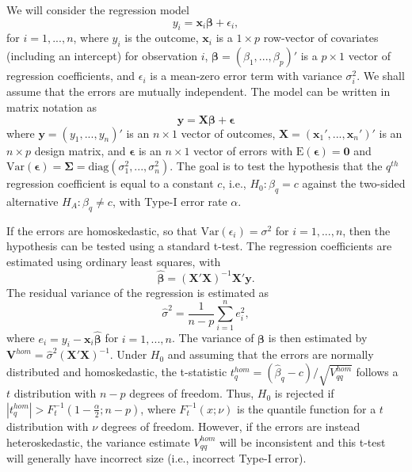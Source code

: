 \documentclass{article}\usepackage[]{graphicx}\usepackage[]{color}
\newcommand{\E}{\text{E}}
\newcommand{\Var}{\text{Var}}
\newcommand{\diag}{\text{diag}}
\newcommand{\bm}{\mathbf}
\newcommand{\bs}{\boldsymbol}
\begin{document}
We will consider the regression model
\begin{equation}
y_i = \bm{x}_i\bs\beta + \epsilon_i,
\end{equation}
for $i = 1,...,n$, where $y_i$ is the outcome, $\bm{x}_i$ is a $1 \times p$ row-vector of covariates (including an intercept) for observation $i$, $\bs\beta = (\beta_1,...,\beta_p)'$ is a $p \times 1$ vector of regression coefficients, and $\epsilon_i$ is a mean-zero error term with variance $\sigma_i^2$. We shall assume that the errors are mutually independent. The model can be written in matrix notation as
\begin{equation}
\bm{y} = \bm{X}\bs\beta + \bs\epsilon
\end{equation}
where $\bm{y} = \left(y_1,...,y_n\right)'$ is an $n \times 1$ vector of outcomes, $\bm{X} = \left(\bm{x}_1',...,\bm{x}_n'\right)'$ is an $n \times p$ design matrix, and $\bs\epsilon$ is an $n \times 1$ vector of errors with $\E\left(\bs\epsilon\right) = \bm{0}$ and $\Var\left(\bs\epsilon\right) = \bs\Sigma = \diag\left(\sigma_1^2,...,\sigma_n^2\right)$. The goal is to test the hypothesis that the $q^{th}$ regression coefficient is equal to a constant $c$, i.e., $H_0: \beta_q = c$ against the two-sided alternative $H_A: \beta_q \neq c$, with Type-I error rate $\alpha$. 

If the errors are homoskedastic, so that $\Var(\epsilon_i) = \sigma^2$ for $i = 1,...,n$, then the hypothesis can be tested using a standard t-test. The regression coefficients are estimated using ordinary least squares, with \[
\bs{\hat\beta} = \left(\bm{X}'\bm{X}\right)^{-1} \bm{X}'\bm{y}. \]
The residual variance of the regression is estimated as \[
\hat\sigma^2 = \frac{1}{n - p} \sum_{i=1}^n e_i^2, \]
where $e_i = y_i - \bm{x}_i\bs{\hat\beta}$ for $i = 1,...,n$. The variance of $\bs\beta$ is then estimated by $\bm{V}^{hom} = \hat\sigma^2 \left(\bm{X}'\bm{X}\right)^{-1}$. Under $H_0$ and assuming that the errors are normally distributed and homoskedastic, the t-statistic $t^{hom}_q = \left(\hat\beta_q - c\right) / \sqrt{V_{qq}^{hom}}$ follows a $t$ distribution with $n - p$ degrees of freedom. Thus, $H_0$ is rejected if $|t^{hom}_q| > F_t^{-1}\left(1 - \frac{\alpha}{2}; n - p\right)$, where $F_t^{-1}(x; \nu)$ is the quantile function for a $t$ distribution with $\nu$ degrees of freedom. However, if the errors are instead heteroskedastic, the variance estimate $V^{hom}_{qq}$ will be inconsistent and this t-test will generally have incorrect size (i.e., incorrect Type-I error). 
\end{document}
